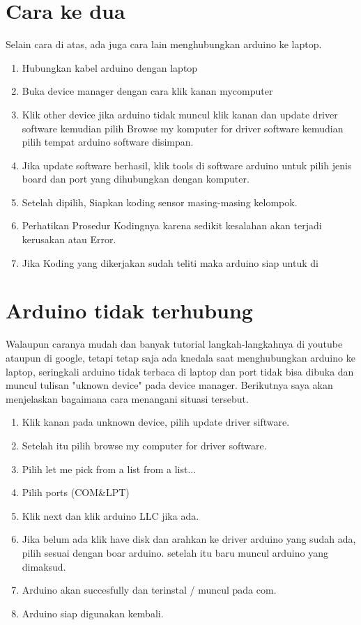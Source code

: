 \section{Cara ke dua}
Selain cara di atas, ada juga cara lain menghubungkan arduino ke laptop.
\begin{enumerate}
\item Hubungkan kabel arduino dengan laptop
\item Buka device manager dengan cara klik kanan mycomputer
\item Klik other device jika arduino tidak muncul klik kanan dan update driver software kemudian pilih Browse my komputer for driver software kemudian pilih tempat arduino software disimpan.
\item Jika update software berhasil, klik tools di software arduino untuk pilih jenis board dan port yang dihubungkan dengan komputer.
\item Setelah dipilih, Siapkan koding sensor masing-masing kelompok.
\item Perhatikan Prosedur Kodingnya karena sedikit kesalahan akan terjadi kerusakan atau Error.
\item Jika Koding yang dikerjakan sudah teliti maka arduino siap untuk di
\end{enumerate}
\section{Arduino tidak terhubung}
Walaupun caranya mudah dan banyak tutorial langkah-langkahnya di youtube ataupun di google, tetapi tetap saja ada knedala saat menghubungkan arduino ke laptop, seringkali arduino tidak terbaca di laptop dan port tidak bisa dibuka dan muncul tulisan "uknown device" pada device manager.
Berikutnya saya akan menjelaskan bagaimana cara menangani situasi tersebut.
\begin{enumerate}
\item Klik kanan pada unknown device, pilih update driver siftware.
\item Setelah itu pilih browse my computer for driver software.
\item Pilih let me pick from a list from a list...
\item Pilih ports (COM\&LPT)
\item Klik next dan klik arduino LLC jika ada.
\item Jika belum ada klik have disk dan arahkan ke driver arduino yang sudah ada, pilih sesuai dengan boar arduino. setelah itu baru muncul arduino yang dimaksud.
\item Arduino akan succesfully dan terinstal / muncul pada com.
\item Arduino siap digunakan kembali.
\end{enumerate}